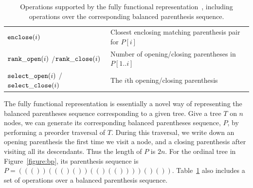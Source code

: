 \begin{table}[t]
\begin{center}
\begin{tabular} {|p{2.4cm}|p{5.2cm}|}
$\mathtt{enclose}(i)$                           &Closest enclosing matching parenthesis pair for $P[i]$ \\
$\mathtt{rank\_open}(i)$ /$\mathtt{rank\_close}(i)$       &Number of opening/closing parentheses in $P[1..i]$\\
$\mathtt{select\_open}(i)$ /$\mathtt{select\_close}(i)$   &The $i$th opening/closing parenthesis\\ \hline
\end{tabular}
\caption{Operations supported by the fully functional representation~\cite{Navarro:2014:FFS:2620785.2601073}, including operations over the corresponding balanced parenthesis sequence.}
\label{tbl:operations}
\end{center}
\end{table}

The fully functional representation is essentially a novel way of representing the balanced parentheses sequence corresponding to a given tree. 
Give a tree $T$ on $n$ nodes, we can generate its corresponding balanced parentheses sequence, $P$, by performing a preorder traversal of $T$. 
During this traversal, we write down an opening parenthesis the first time we visit a node, and a closing parenthesis after visiting all its descendants. 
Thus the length of $P$ is $2n$. 
For the ordinal tree in Figure~\ref{figure:bp}, its parenthesis sequence is $P = ((())((()())(()(())))()())$. 
Table~\ref{tbl:operations} also includes a set of operations over a balanced parenthesis sequence.%

